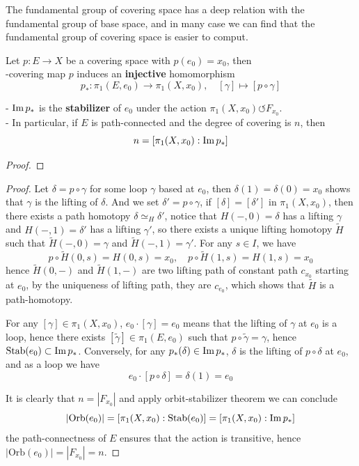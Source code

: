 The fundamental group of covering space has a deep relation with the fundamental group of base space, and in many case we can find that the fundamental group of covering space is easier to comput.
\begin{proposition} \label{injectivemorphism}
    Let \(p:E \to X\) be a covering space with \(p(e_0) = x_0\), then\\
    
    -covering map \(p\) induces an \textbf{injective} homomorphism
    \[p_*: \pi_1(E,e_0) \to \pi_1(X,x_0), \quad [\gamma] \mapsto [p \circ \gamma]\]

    - \(\operatorname{Im} p_*\) is the \textbf{stabilizer} of \(e_0\) under the action \(\pi_1(X,x_0) \circlearrowleft F_{x_0}\).\\

    - In particular, if \(E\) is path-connected and the degree of covering is \(n\), then
    \[n = [\pi_1(X,x_0): \operatorname{Im} p_*]\]
\end{proposition}
\begin{proof}
    
\end{proof}
\begin{proof}
    Let \(\delta = p \circ \gamma\) for some loop \(\gamma \) based at \(e_0\), then \(\delta(1) = \delta(0) = x_0\) shows that \(\gamma\) is the lifting of \(\delta\). And we set \(\delta'  = p \circ \gamma\), if \([\delta] = [\delta']\) in \(\pi_1(X,x_0)\), then there exists a path homotopy \(\delta \simeq_H \delta'\), notice that \(H(-,0) = \delta\) has a lifting \(\gamma\) and \(H(-,1) = \delta'\) has a lifting \(\gamma'\), so there exists a unique lifting homotopy \(\tilde{H}\) such that \(\tilde{H}(-,0) = \gamma\) and \(\tilde{H}(-,1) = \gamma'\). For any \(s \in I\), we have
    \[p\circ \tilde{H}(0,s) = H(0,s) = x_0, \quad p\circ \tilde{H}(1,s) = H(1,s) = x_0\]
    hence \(\tilde{H}(0,-)\) and \(\tilde{H}(1,-)\) are two lifting path of constant path \(c_{x_0}\) starting at \(e_0\), by the uniqueness of lifting path, they are \(c_{e_0}\), which shows that \(\tilde{H}\) is a path-homotopy.
    
    For any \([\gamma] \in \pi_1(X,x_0)\), \(e_0 \cdot [\gamma] = e_0\) means that the lifting of \(\gamma\) at \(e_0\) is a loop, hence there exists \([\tilde{\gamma}] \in \pi_1(E,e_0)\) such that \(p \circ \tilde{\gamma} = \gamma\), hence \(\mathrm{Stab}(e_0) \subset \operatorname{Im} p_*\). Conversely, for any \(p_*(\delta) \in \operatorname{Im} p_*\), \(\delta\) is the lifting of \(p \circ \delta\) at \(e_0\), and as a loop we have
    \[e_0 \cdot [p\circ \delta] = \delta(1) = e_0\]

    It is clearly that \(n = |F_{x_0}|\) and apply orbit-stabilizer theorem we can conclude
    \[|\mathrm{Orb}(e_0)| = [\pi_1(X,x_0): \mathrm{Stab}(e_0)] = [\pi_1(X,x_0): \operatorname{Im} p_*]\]
    the path-connectness of \(E\) ensures that the action is transitive, hence \(|\mathrm{Orb}(e_0)| = |F_{x_0}| = n\).
\end{proof}

